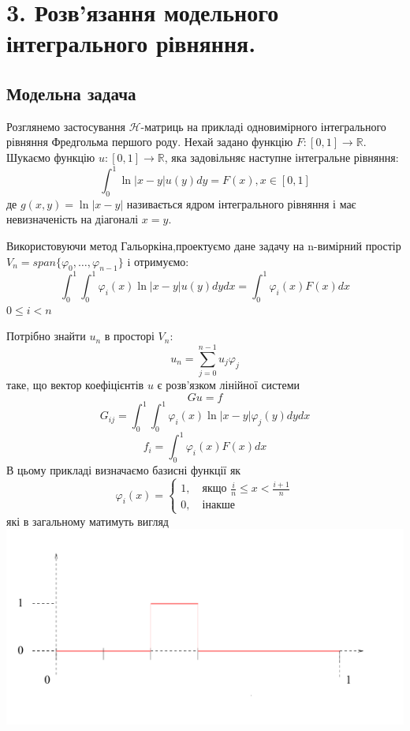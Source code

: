 \documentclass[12pt]{report}
\begin{document}
	\chapter{3. Розв'язання модельного інтегрального рівняння.}
	\section{Модельна задача}
	\hspace{0.8cm}Розглянемо застосування {$\mathcal{H}$}-матриць на прикладі одновимірного інтегрального рівняння Фредгольма першого роду. Нехай задано функцію $F:[0,1]\rightarrow \mathbb{R}$. Шукаємо функцію $u:[0,1]\rightarrow \mathbb{R}$, яка задовільняє наступне інтегральне рівняння: $$\int_{0}^{1}\ln|x-y|u(y)dy=F(x), x\in[0,1]$$
	де $g(x,y)=\ln|x-y|$ називається ядром інтегрального рівняння і має невизначеність на діагоналі $x=y$.
	\par Використовуючи метод Гальоркіна,проектуємо дане задачу на n-вимірний простір $V_n=span\{\varphi_0,\dots,\varphi_{n-1}\}$
	i отримуємо:
	$$\int_{0}^{1}\int_{0}^{1}\varphi_i(x)\ln|x-y|u(y)dydx=\int_{0}^{1}\varphi_i(x)F(x)dx$$
	$0\le i<n$
	\par Потрібно знайти $u_n$ в просторі $V_n$:
	$$u_n=\sum_{j=0}^{n-1}u_j\varphi_j$$
	таке, що вектор коефіцієнтів $u$ є розв'язком лінійної системи $$Gu=f$$
	$$G_{ij}=\int_{0}^{1}\int_{0}^{1}\varphi_i(x)\ln|x-y|\varphi_j(y)dydx$$
	$$f_i=\int_{0}^{1}\varphi_i(x)F(x)dx$$
	 В цьому прикладі визначаємо базисні функції як
	\newline 
	\begin{equation*}
	\varphi_i(x)=\begin{cases}
			1,\quad\text{якщо $\frac{i}{n}\le x< \frac{i+1}{n}$}\\
			0,\quad\text{інакше}
				\end{cases}
	\end{equation*}
	\newline
	які в загальному матимуть вигляд 
	\newline
		\includegraphics{1_1}
\end{document}
